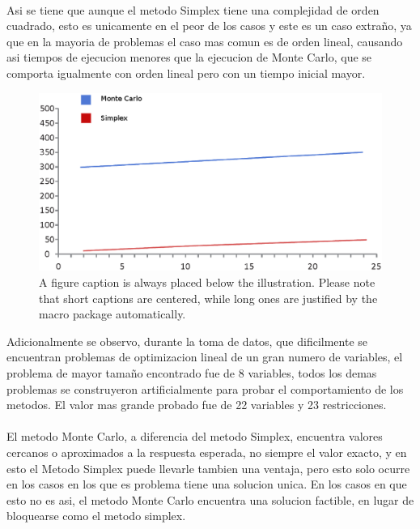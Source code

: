 \documentclass[runningheads]{llncs}
\begin{document}
\paragraph{}
Asi se tiene que aunque el metodo Simplex tiene una complejidad de orden cuadrado, esto es unicamente en el peor de los casos y este es un caso extraño, ya que en la mayoria de problemas el caso mas comun es de orden lineal, causando asi tiempos de ejecucion menores que la ejecucion de Monte Carlo, que se comporta igualmente con orden lineal pero con un tiempo inicial mayor.

\begin{figure}
\includegraphics[width=\textwidth]{fig1.eps}
\caption{A figure caption is always placed below the illustration.
Please note that short captions are centered, while long ones are
justified by the macro package automatically.} \label{fig1}
\end{figure}

Adicionalmente se observo, durante la toma de datos, que dificilmente se encuentran problemas de optimizacion lineal de un gran numero de variables, el problema de mayor tamaño encontrado fue de 8 variables, todos los demas problemas se construyeron artificialmente para probar el comportamiento de los metodos. El valor mas grande probado fue de 22 variables y 23 restricciones. 
\paragraph{}
El metodo Monte Carlo, a diferencia del metodo Simplex, encuentra valores cercanos o aproximados a la respuesta esperada, no siempre el valor exacto, y en esto el Metodo Simplex puede llevarle tambien una ventaja, pero esto solo ocurre en los casos en los que es problema tiene una solucion unica. En los casos en que esto no es asi, el metodo Monte Carlo encuentra una solucion factible, en lugar de bloquearse como el metodo simplex.  
\end{document}
